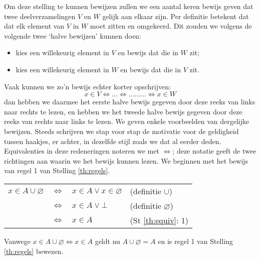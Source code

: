 Om deze stelling te kunnen bewijzen zullen we een aantal keren bewijs geven dat twee deelverzamelingen $V$ en $W$ gelijk aan elkaar zijn. Per definitie betekent dat dat elk element van $V$ in $W$ moet zitten en omgekeerd. Dit zouden we volgens de volgende twee `halve bewijzen' kunnen doen:
\begin{itemize}
    \item kies een willekeurig element in $V$ en bewijs dat die in $W$ zit;
    \item kies een willekeurig element in $W$ en bewijs dat die in $V$ zit.
\end{itemize}
Vaak kunnen we zo'n bewijs echter korter opschrijven:
$$x\in V\Leftrightarrow\ldots\Leftrightarrow\ldots\ldots\ldots\Leftrightarrow x\in W$$
dan hebben we daarmee het eerste halve bewijs gegeven door deze reeks van links naar rechts te lezen, en hebben we het tweede halve bewijs gegeven door deze reeks van rechts naar links te lezen. We geven enkele voorbeelden van dergelijke bewijzen. Steeds schrijven we stap voor stap de motivatie voor de geldigheid tussen haakjes, er achter, in dezelfde stijl zoals we dat al eerder deden. Equivalenties in deze redeneringen noteren we met $\Leftrightarrow$; deze notatie geeft de twee richtingen aan waarin we het bewijs kunnen lezen. We beginnen met het bewijs van regel 1 van Stelling \ref{th:regels}.
\begin{center}
    \begin{tabular}{ccll}
        $x\in A\cup\varnothing$ & $\Leftrightarrow$ & $x\in A\lor x\in\varnothing$ & (definitie $\cup$) \\
        & $\Leftrightarrow$ & $x\in A\lor\bot$ & (definitie $\varnothing$)\\
        & $\Leftrightarrow$ & $x\in A$ & (St \ref{th:equiv}: 1)
    \end{tabular}
\end{center}
Vanwege $x\in A\cup\varnothing\Leftrightarrow x\in A$ geldt nu $A\cup\varnothing=A$ en is regel 1 van Stelling \ref{th:regels} bewezen.

